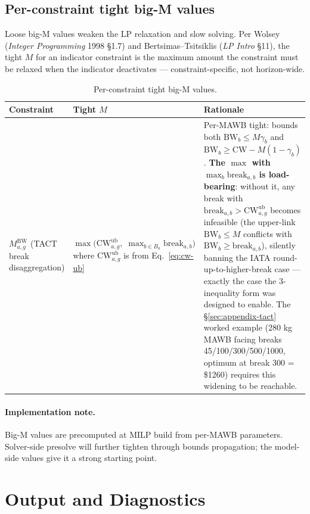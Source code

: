 \documentclass[11pt,a4paper]{article}
\theoremstyle{definition}
\begin{document}
\subsection{Per-constraint tight big-M values}
\label{sec:bigm-tightening}

Loose big-M values weaken the LP relaxation and slow solving. Per Wolsey
(\emph{Integer Programming} 1998 \S1.7) and Bertsimas--Tsitsiklis
(\emph{LP Intro} \S11), the tight $M$ for an indicator constraint is the
maximum amount the constraint must be relaxed when the indicator deactivates
--- constraint-specific, not horizon-wide.

\begin{table}[H]
\centering
\caption{Per-constraint tight big-M values.}
\label{tab:bigm-tightening-tab}
\begin{tabular}{p{2.8cm}p{4.0cm}p{7.5cm}}
\toprule
Constraint & Tight $M$ & Rationale \\
\midrule
$M^{\text{BW}}_{a,g}$ (TACT break disaggregation) & $\max\bigl(\text{CW}^{\text{ub}}_{a,g},\; \max_{b \in B_a} \text{break}_{a,b}\bigr)$ where $\text{CW}^{\text{ub}}_{a,g}$ is from Eq.~\ref{eq:cw-ub} & Per-MAWB tight: bounds both $\text{BW}_b \leq M \gamma_b$ and $\text{BW}_b \geq \text{CW} - M(1 - \gamma_b)$. \textbf{The $\max$ with $\max_b \text{break}_{a,b}$ is load-bearing}: without it, any break with $\text{break}_{a,b} > \text{CW}^{\text{ub}}_{a,g}$ becomes infeasible (the upper-link $\text{BW}_b \leq M$ conflicts with $\text{BW}_b \geq \text{break}_{a,b}$), silently banning the IATA round-up-to-higher-break case --- exactly the case the 3-inequality form was designed to enable. The §\ref{sec:appendix-tact} worked example (280 kg MAWB facing breaks 45/100/300/500/1000, optimum at break 300 = \$1260) requires this widening to be reachable. \\
\bottomrule
\end{tabular}
\end{table}

\paragraph{Implementation note.}
Big-M values are precomputed at MILP build from per-MAWB parameters.
Solver-side presolve will further tighten through bounds propagation; the
model-side values give it a strong starting point.

\section{Output and Diagnostics}
\label{sec:output-diagnostics}
\end{document}
